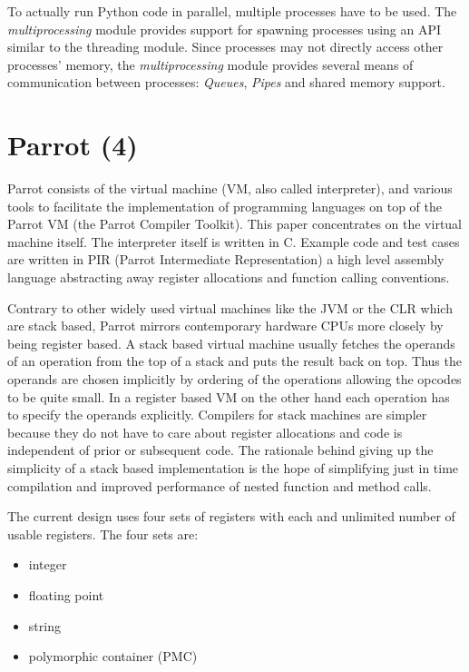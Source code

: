 \documentclass[bachelor,english]{hgbthesis}
\begin{document}
To actually run Python code in parallel, multiple processes have to be used. The \textit{multiprocessing} module provides support for spawning processes using an API similar to the threading module\cite{PythonMultiProcessingManual}. Since processes may not directly access other processes' memory, the \textit{multiprocessing} module provides several means of communication between processes: \textit{Queues}, \textit{Pipes} and shared memory support.

\chapter{Parrot (4)}

Parrot consists of the virtual machine (VM, also called interpreter), and various tools to facilitate the implementation of programming languages on top of the Parrot VM (the Parrot Compiler Toolkit). This paper concentrates on the virtual machine itself. The interpreter itself is written in C. Example code and test cases are written in PIR (Parrot Intermediate Representation) a high level assembly language abstracting away register allocations and function calling conventions.

Contrary to other widely used virtual machines like the JVM or the CLR which are stack based, Parrot mirrors contemporary hardware CPUs more closely by being register based. A stack based virtual machine usually fetches the operands of an operation from the top of a stack and puts the result back on top. Thus the operands are chosen implicitly by ordering of the operations allowing the opcodes to be quite small. In a register based VM on the other hand each operation has to specify the operands explicitly. Compilers for stack machines are simpler because they do not have to care about register allocations and code is independent of prior or subsequent code\cite{VMShowdown}. The rationale behind giving up the simplicity of a stack based implementation is the hope of simplifying just in time compilation and improved performance of nested function and method calls.

The current design uses four sets of registers with each and unlimited number of usable registers. The four sets are:
%
\begin{itemize}
\item integer
\item floating point
\item string
\item polymorphic container (PMC)
\end{itemize}
\end{document}
